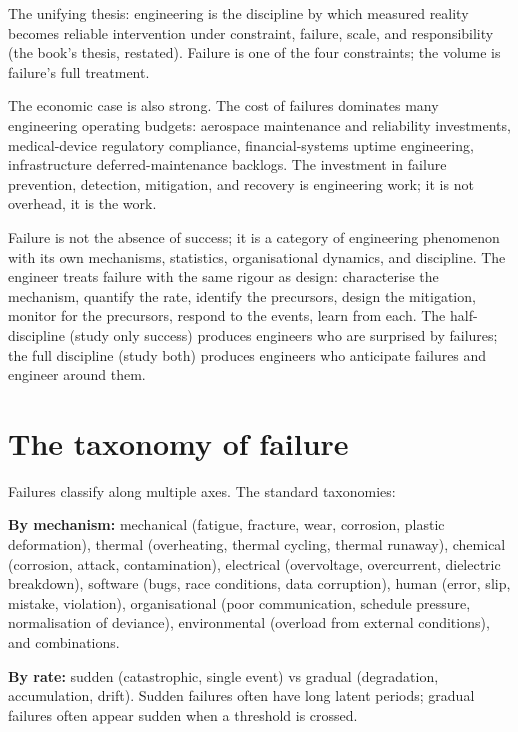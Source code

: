 The unifying thesis: engineering is the discipline by which measured reality becomes reliable intervention under constraint, failure, scale, and responsibility (the book's thesis, restated). Failure is one of the four constraints; the volume is failure's full treatment.

The economic case is also strong. The cost of failures dominates many engineering operating budgets: aerospace maintenance and reliability investments, medical-device regulatory compliance, financial-systems uptime engineering, infrastructure deferred-maintenance backlogs. The investment in failure prevention, detection, mitigation, and recovery is engineering work; it is not overhead, it is the work.

\begin{archetype}
Failure is not the absence of success; it is a category of engineering phenomenon with its own mechanisms, statistics, organisational dynamics, and discipline. The engineer treats failure with the same rigour as design: characterise the mechanism, quantify the rate, identify the precursors, design the mitigation, monitor for the precursors, respond to the events, learn from each. The half-discipline (study only success) produces engineers who are surprised by failures; the full discipline (study both) produces engineers who anticipate failures and engineer around them.
\end{archetype}

\section{The taxonomy of failure}

Failures classify along multiple axes. The standard taxonomies:

\textbf{By mechanism:} mechanical (fatigue, fracture, wear, corrosion, plastic deformation), thermal (overheating, thermal cycling, thermal runaway), chemical (corrosion, attack, contamination), electrical (overvoltage, overcurrent, dielectric breakdown), software (bugs, race conditions, data corruption), human (error, slip, mistake, violation), organisational (poor communication, schedule pressure, normalisation of deviance), environmental (overload from external conditions), and combinations.

\textbf{By rate:} sudden (catastrophic, single event) vs gradual (degradation, accumulation, drift). Sudden failures often have long latent periods; gradual failures often appear sudden when a threshold is crossed.

